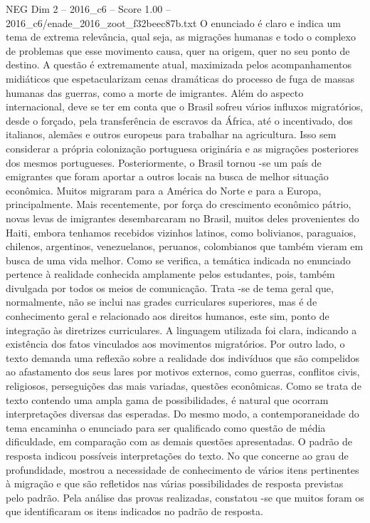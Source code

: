 \begin{textsample}{NEG Dim 2 – 2016\_c6 – Score 1.00 – 2016\_c6/enade\_2016\_zoot\_f32beec87b.txt}
O enunciado é claro e indica um tema de extrema relevância, qual seja, as migrações humanas e todo o complexo de problemas que esse movimento causa, quer na origem, quer no seu ponto de destino.
A questão é extremamente atual, maximizada pelos acompanhamentos midiáticos que espetacularizam cenas dramáticas do processo de fuga de massas humanas das guerras, como a morte de imigrantes.
Além do aspecto internacional, deve se ter em conta que o Brasil sofreu vários influxos migratórios, desde o forçado, pela transferência de escravos da África, até o incentivado, dos italianos, alemães e outros europeus para trabalhar na agricultura.
Isso sem considerar a própria colonização portuguesa originária e as migrações posteriores dos mesmos portugueses.
Posteriormente, o Brasil tornou -se um país de emigrantes que foram aportar a outros locais na busca de melhor situação econômica.
Muitos migraram para a América do Norte e para a Europa, principalmente.
Mais recentemente, por força do crescimento econômico pátrio, novas levas de imigrantes desembarcaram no Brasil, muitos deles provenientes do Haiti, embora tenhamos recebidos vizinhos latinos, como bolivianos, paraguaios, chilenos, argentinos, venezuelanos, peruanos, colombianos que também vieram em busca de uma vida melhor.
Como se verifica, a temática indicada no enunciado pertence à realidade conhecida amplamente pelos estudantes, pois, também divulgada por todos os meios de comunicação.
Trata -se de tema geral que, normalmente, não se inclui nas grades curriculares superiores, mas é de conhecimento geral e relacionado aos direitos humanos, este sim, ponto de integração às diretrizes curriculares.
A linguagem utilizada foi clara, indicando a existência dos fatos vinculados aos movimentos migratórios.
Por outro lado, o texto demanda uma reflexão sobre a realidade dos indivíduos que são compelidos ao afastamento dos seus lares por motivos externos, como guerras, conflitos civis, religiosos, perseguições das mais variadas, questões econômicas.
Como se trata de texto contendo uma ampla gama de possibilidades, é natural que ocorram interpretações diversas das esperadas.
Do mesmo modo, a contemporaneidade do tema encaminha o enunciado para ser qualificado como questão de média dificuldade, em comparação com as demais questões apresentadas.
O padrão de resposta indicou possíveis interpretações do texto.
No que concerne ao grau de profundidade, mostrou a necessidade de conhecimento de vários itens pertinentes à migração e que são refletidos nas várias possibilidades de resposta previstas pelo padrão.
Pela análise das provas realizadas, constatou -se que muitos foram os que identificaram os itens indicados no padrão de resposta.

\end{textsample}
